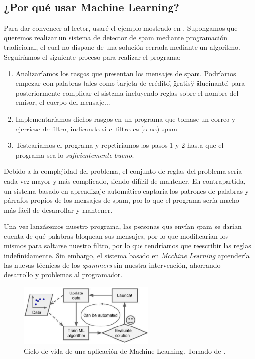 \documentclass[../main.tex]{subfiles}
\begin{document}
\subsection{¿Por qué usar Machine Learning?}

Para dar convencer al lector, usaré el ejemplo mostrado en \cite{Geron2019}. Supongamos que queremos realizar un sistema de detector de spam mediante programación tradicional, el cual no dispone de una solución cerrada mediante un algoritmo. Seguiríamos el siguiente proceso para realizar el programa:

\begin{enumerate}
    \item Analizaríamos los rasgos que presentan los mensajes de spam. Podríamos empezar con palabras tales como \"tarjeta de crédito\", \"gratis\" y \"alucinante\", para posteriormente complicar el sistema incluyendo reglas sobre el nombre del emisor, el cuerpo del mensaje...
    \item Implementaríamos dichos rasgos en un programa que tomase un correo y ejerciese de filtro, indicando si el filtro es (o no) spam.
    \item Testearíamos el programa y repetiríamos los pasos 1 y 2 hasta que el programa sea lo \textit{suficientemente bueno}.
\end{enumerate}

Debido a la complejidad del problema, el conjunto de reglas del problema sería cada vez mayor y más complicado, siendo difícil de mantener. En contrapartida, un sistema basado en aprendizaje automático captaría los patrones de palabras y párrafos propios de los mensajes de spam, por lo que el programa sería mucho más fácil de desarrollar y mantener.\newline

Una vez lanzásemos nuestro programa, las personas que envían spam se darían cuenta de qué palabras bloquean sus mensajes, por lo que modificarían los mismos para saltarse nuestro filtro, por lo que tendríamos que reescribir las reglas indefinidamente. Sin embargo, el sistema basado en \textit{Machine Learning} aprendería las nuevas técnicas de los \textit{spammers} sin nuestra intervención, ahorrando desarrollo y problemas al programador. \newline

\begin{figure}[h]
    \centering
    \includegraphics[width=0.6\textwidth]{imagenes/Ciclo vida ML.png}
    \caption[Ciclo de vida de una aplicación de Machine Learning.]{Ciclo de vida de una aplicación de Machine Learning. Tomado de \cite{Geron2019}.}
    \label{fig:ciclo_vida_ml}
\end{figure}
\end{document}

